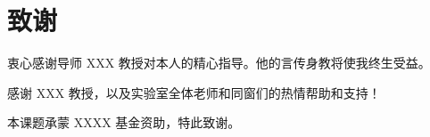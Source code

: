 \chapter*{致\quad 谢}
\setlength{\parindent}{2em}
衷心感谢导师 XXX 教授对本人的精心指导。他的言传身教将使我终生受益。

感谢 XXX 教授，以及实验室全体老师和同窗们的热情帮助和支持！

本课题承蒙 XXXX 基金资助，特此致谢。

